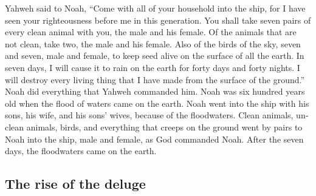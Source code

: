 \begin{paracol}{2}
\begin{otherlanguage}{english}
 Yahweh said to Noah, ``Come with all of your household
into the ship, for I have seen your righteousness before me in this
generation.  You shall take seven pairs of every clean
animal with you, the male and his female. Of the animals that are not
clean, take two, the male and his female.  Also of the
birds of the sky, seven and seven, male and female, to keep seed alive
on the surface of all the earth.  In seven days, I will
cause it to rain on the earth for forty days and forty nights. I will
destroy every living thing that I have made from the surface of the
ground.''  Noah did everything that Yahweh commanded him.
 Noah was six hundred years old when the flood of waters
came on the earth.  Noah went into the ship with his sons,
his wife, and his sons' wives, because of the floodwaters.
 Clean animals, unclean animals, birds, and everything
that creeps on the ground  went by pairs to Noah into the
ship, male and female, as God commanded Noah.  After the
seven days, the floodwaters came on the earth.

\hypertarget{the-rise-of-the-deluge}{%
\subsection{The rise of the deluge}\label{the-rise-of-the-deluge}}


\end{otherlanguage}
\end{paracol}
